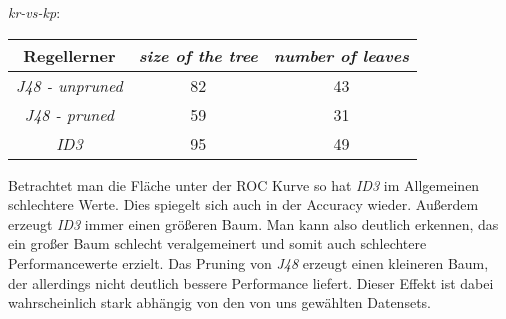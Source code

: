 \emph{kr-vs-kp}:
\begin{tabular}{c|c|c}
	Regellerner       & \emph{size of the tree} & \emph{number of leaves}  \\ \hline
	\emph{J48 - unpruned}  & 82 & 43 \\ \hline
	\emph{J48 - pruned} & 59  & 31 \\ \hline
	\emph{ID3}  & 95 & 49\\ \hline
\end{tabular}

Betrachtet man die Fl\"ache unter der ROC Kurve so hat \emph{ID3} im Allgemeinen schlechtere Werte. Dies spiegelt sich auch in der Accuracy wieder. Au\ss erdem erzeugt \emph{ID3} immer einen gr\"o\ss eren Baum. Man kann also deutlich erkennen, das ein gro\ss er Baum schlecht veralgemeinert und somit auch schlechtere Performancewerte erzielt. Das Pruning von \emph{J48} erzeugt einen kleineren Baum, der allerdings nicht deutlich bessere Performance liefert. Dieser Effekt ist dabei wahrscheinlich stark abh\"angig von den von uns gew\"ahlten Datensets.